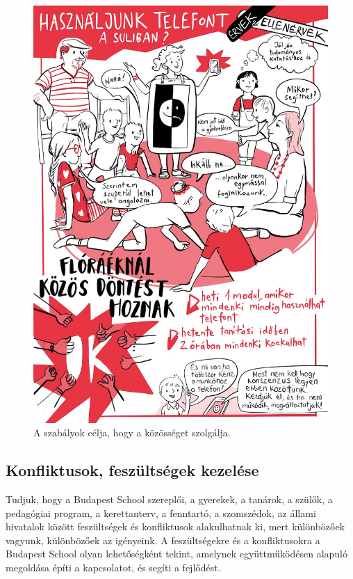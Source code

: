 \begin{figure}
\centering
\includegraphics{pics/5b_dontes.jpg}
\caption{A szabályok célja, hogy a közösséget szolgálja.}
\end{figure}

\hypertarget{konfliktusok-feszultsegek-kezelese}{%
\subsection{Konfliktusok, feszültségek
kezelése}\label{konfliktusok-feszultsegek-kezelese}}

Tudjuk, hogy a Budapest School szereplői, a gyerekek, a tanárok, a
szülők, a pedagógiai program, a kerettanterv, a fenntartó, a szomszédok,
az állami hivatalok között feszültségek és konfliktusok alakulhatnak ki,
mert különbözőek vagyunk, különbözőek az igényeink. A feszültségekre és
a konfliktusokra a Budapest School olyan lehetőségként tekint, amelynek
együttműködésen alapuló megoldása építi a kapcsolatot, és segíti a
fejlődést.

